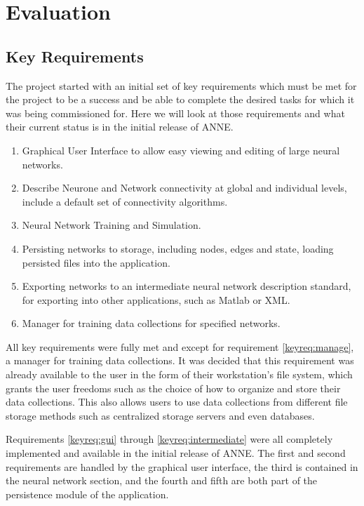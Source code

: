 \documentclass{acm_proc_article-sp}
\begin{document}
\section{Evaluation}
\subsection{Key Requirements}
{
The project started with an initial set of key requirements which must be met for the project to be a success and be able to complete the desired tasks for which it was being commissioned for. Here we will look at those requirements and what their current status is in the initial release of ANNE.
\begin{enumerate}
\item{
\label{keyreq:gui}
Graphical User Interface to allow easy viewing and editing of large neural networks.
}
\item{
\label{keyreq:connectivity}
Describe Neurone and Network connectivity at global and individual levels, include a default set of connectivity algorithms.
}
\item{
\label{keyreq:tands}
Neural Network Training and Simulation.
}
\item{
\label{keyreq:persistence}
Persisting networks to storage, including nodes, edges and state, loading persisted files into the application.
}
\item{
\label{keyreq:intermediate}
Exporting networks to an intermediate neural network description standard, for exporting into other applications, such as Matlab or XML.
}
\item{
\label{keyreq:manage}
Manager for training data collections for specified networks.
}
\end{enumerate}

All key requirements were fully met and except for requirement \ref{keyreq:manage}, a manager for training data collections. It was decided that this requirement was already available to the user in the form of their workstation's file system, which grants the user freedoms such as the choice of how to organize and store their data collections. This also allows users to use data collections from different file storage methods such as centralized storage servers and even databases.

Requirements \ref{keyreq:gui} through \ref{keyreq:intermediate} were all completely implemented and available in the initial release of ANNE. The first and second requirements are handled by the graphical user interface, the third is contained in the neural network section, and the fourth and fifth are both part of the persistence module of the application.
}
\end{document}
